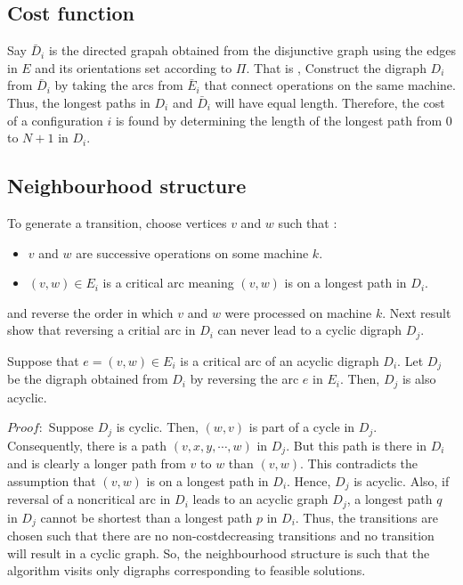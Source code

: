 \documentclass[letterpaper,english,10pt]{article}
\begin{document}
\subsection{Cost function}
Say $\bar{D}_i$ is the directed grapah obtained from the disjunctive graph using the edges in $E$ and its orientations set according to $\Pi$. That is , 
Construct the digraph $D_i$ from $\bar{D}_i$ by taking the arcs from $\bar{E}_i$ that connect operations on the same machine. Thus, the longest paths in $D_i$ and $\bar{D}_i$ will have equal length. Therefore, the cost of a configuration $i$ is found by determining the length of the longest path from $0$ to $N+1$ in $D_i$. 
\subsection{Neighbourhood structure}
To generate a transition, choose vertices $v$ and $w$ such that :
 \begin{itemize}
 \item $v$ and $w$ are successive operations on some machine $k$.
 \item $(v,w) \in E_i$ is a critical arc meaning $(v,w)$ is on a longest path in $D_i$.
 \end{itemize}
 and reverse the order in which $v$ and $w$ were processed on machine $k$. 
Next  result show that reversing a critial arc in  $D_i$ can never lead to a cyclic digraph $D_j$.
\begin{lem}
Suppose that $e = (v,w) \in E_i$ is a critical arc of an acyclic digraph $D_i$. Let $D_j$ be the digraph obtained from $D_i$ by reversing the arc $e$ in $E_i$. Then, $D_j$ is also acyclic.  
\end{lem}
$Proof:$
Suppose $D_j$ is cyclic. Then, $(w,v)$ is part of a cycle in $D_j$. Consequently, there is a path $(v,x,y,\cdots,w)$ in $D_j$. But this path is there in $D_i$ and is clearly a longer path from $v$ to $w$ than $(v,w)$. This contradicts the assumption that $(v,w)$ is on a longest path in $D_i$. Hence, $D_j$ is acyclic.
Also, if reversal of a noncritical arc in $D_i$ leads to an acyclic graph $D_j$, a longest path $q$ in $D_j$ cannot be shortest than a longest path $p$ in $D_i$.
Thus, the transitions are chosen such that there are no non-costdecreasing transitions and no transition will result in a cyclic graph. So, the neighbourhood structure is such that the algorithm visits only digraphs corresponding to feasible solutions.
\end{document}
